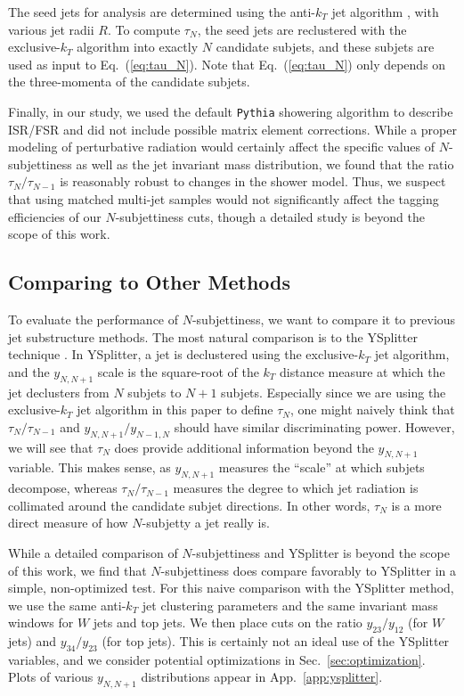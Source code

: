 \documentclass{JHEP3}
\DeclareRobustCommand{\Sec}[1]{Sec.~\ref{#1}}
\DeclareRobustCommand{\App}[1]{App.~\ref{#1}}
\DeclareRobustCommand{\Eq}[1]{Eq.~(\ref{#1})}
\begin{document}
The seed jets for analysis are determined using the anti-$k_T$ jet algorithm \cite{Cacciari:2008gp}, with various jet radii $R$.  To compute $\tau_N$, the seed jets are reclustered with the exclusive-$k_T$ algorithm \cite{Catani:1993hr,Ellis:1993tq} into exactly $N$ candidate subjets, and these subjets are used as input to \Eq{eq:tau_N}.  Note that \Eq{eq:tau_N} only depends on the three-momenta of the candidate subjets.  

Finally, in our study, we used the default \texttt{Pythia} showering algorithm to describe ISR/FSR and did not include possible matrix element corrections.  While a proper modeling of perturbative radiation would certainly affect the specific values of $N$-subjettiness as well as the jet invariant mass distribution, we found that the ratio $\tau_N/\tau_{N-1}$ is reasonably robust to changes in the shower model.  Thus, we suspect that using matched multi-jet samples \cite{Alwall:2007fs} would not significantly affect the tagging efficiencies of our $N$-subjettiness cuts, though a detailed study is beyond the scope of this work. 


\subsection{Comparing to Other Methods}

To evaluate the performance of $N$-subjettiness, we want to compare it to previous jet substructure methods.   The most natural comparison is to the YSplitter technique \cite{Butterworth:2002tt,YSplitter,Brooijmans:2008}.  In YSplitter, a jet is declustered using the exclusive-$k_T$ jet algorithm, and the $y_{N,N+1}$ scale is the square-root of the $k_T$ distance measure at which the jet declusters from $N$ subjets to $N+1$ subjets.  Especially since we are using the  exclusive-$k_T$ jet algorithm in this paper to define $\tau_N$, one might naively think that $\tau_N/\tau_{N-1}$ and $y_{N,N+1}/y_{N-1,N}$ should have similar discriminating power.  However, we will see that $\tau_N$ does provide additional information beyond the $y_{N,N+1}$ variable.  This makes sense, as $y_{N,N+1}$ measures the ``scale'' at which subjets decompose, whereas $\tau_N/\tau_{N-1}$ measures the degree to which jet radiation is collimated around the candidate subjet directions.  In other words, $\tau_N$ is a more direct measure of how $N$-subjetty a jet really is.  

While a detailed comparison of $N$-subjettiness and YSplitter is beyond the scope of this work, we find that $N$-subjettiness does compare favorably to YSplitter in a simple, non-optimized test.  For this naive comparison with the YSplitter method, we use the same anti-${k_T}$ jet clustering parameters and the same invariant mass windows for $W$ jets and top jets.  We then place cuts on the ratio $y_{23} / y_{12}$ (for $W$ jets) and $y_{34} / y_{23}$ (for top jets).  This is certainly not an ideal use of the YSplitter variables, and we consider potential optimizations in \Sec{sec:optimization}.  Plots of various $y_{N,N+1}$ distributions appear in \App{app:ysplitter}.
\end{document}
